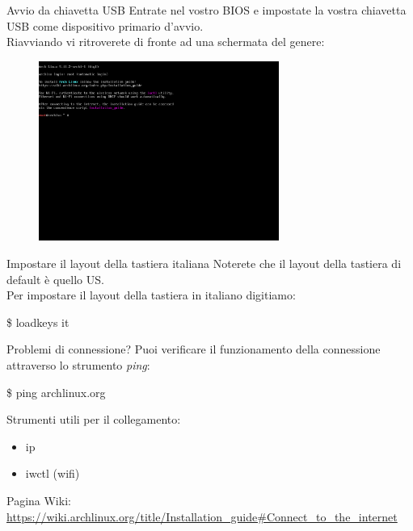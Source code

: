 \begin{frame}{Avvio da chiavetta USB}
    Entrate nel vostro BIOS e impostate la vostra chiavetta USB come dispositivo primario d'avvio.\\
    Riavviando vi ritroverete di fronte ad una schermata del genere:
    \begin{figure}[h]
        \includegraphics[width=0.7\textwidth]{images/arch1.png}
    \end{figure}
\end{frame}

\begin{frame}{Impostare il layout della tastiera italiana}
    Noterete che il layout della tastiera di default è quello US.\\
    Per impostare il layout della tastiera in italiano digitiamo:
    \begin{block}{}
        \$ loadkeys it
    \end{block}
\end{frame}

\begin{frame}{Problemi di connessione?}
Puoi verificare il funzionamento della connessione attraverso
lo strumento \textit{ping}:
\begin{block}{}
    \$ ping archlinux.org
\end{block}

Strumenti utili per il collegamento:
\begin{itemize}
    \item ip
    \item iwctl (wifi)
\end{itemize}

Pagina Wiki: \\
\url{https://wiki.archlinux.org/title/Installation_guide\#Connect_to_the_internet}

\end{frame}